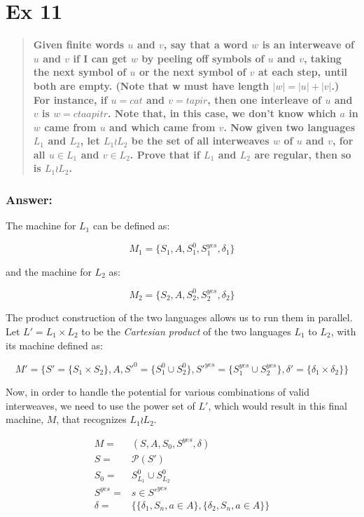 \documentclass[titlepage]{article}\usepackage[]{graphicx}\usepackage[]{color}
\begin{document}
\section*{Ex 11} 
\begin{quote} \textbf{Given finite words $u$ and $v$, say that
    a word $w$ is an interweave of $u$ and $v$ if I can get $w$ by peeling off
    symbols of $u$ and $v$, taking the next symbol of $u$ or the next symbol of
    $v$ at each step, until both are empty. (Note that w must have length $|w|
    = |u| + |v|$.) For instance, if $u = cat$ and $v = tapir$, then one
    interleave of $u$ and $v$ is $w = ctaapitr$. Note that, in this case, we
    don't know which $a$ in $w$ came from $u$ and which came from $v$. Now
    given two languages $L_{1}$ and $L_{2}$, let $L_{1} \wr L_{2}$ be the set
    of all interweaves $w$ of $u$ and $v$, for all $u \in L_{1}$ and $v \in
    L_{2}$. Prove that if $L_{1}$ and $L_{2}$ are regular, then so is $L_{1}
    \wr L_{2}$.}
\end{quote}
\subsubsection*{Answer:}

The machine for $L_1$ can be defined as:

\[ 
	M_{1} = \{S_{1}, A, S_{1}^0, S_{1}^{yes}, \delta_{1} \}
\]

and the machine for $L_2$ as:

\[ 
	M_{2} = \{ S_{2}, A, S_{2}^0, S_{2}^{yes}, \delta_{2} \}
\]

The product construction of the two languages allows us to run them in
parallel. Let $L' = L_1 \times L_2$ to be the \textit{Cartesian product} of the
two languages $L_1$ to $L_2$, with its machine defined as:

\[ 
	M' = \{ S' = \{ S_{1} \times S_{2} \} , A, S'^0 = \{ S_{1}^0 \cup  S_{2}^0
\}, S'^{yes} = \{ S_{1}^{yes} \cup S_{2}^{yes} \} , \delta' = \{ \delta_{1}
\times \delta_{2} \} \}
\]


Now, in order to handle the potential for various combinations of valid
interweaves, we need to use the power set of $L'$, which would result in this
final machine, $M$, that  recognizes $L_1 \wr L_2$.

\begin{align*}
	M =& (S, A, S_0, S^{yes}, \delta) \\
	S =& \mathcal{P}(S')  \\
	S_0 =& S_{L_1}^0 \cup S_{L_2}^0 \\
	S^{yes} =& s \in S'^{yes} \\ 
	\delta =& \{ \{\delta_1, S_n, a \in A \}, \{ \delta_2, S_n, a \in A \} \} 
\end{align*}
\end{document}
